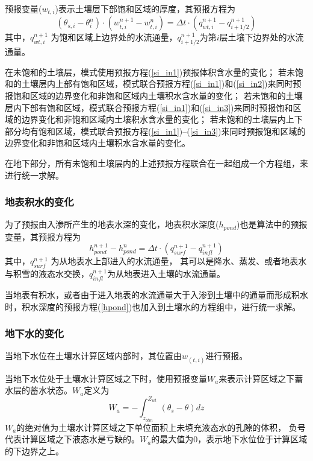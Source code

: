 预报变量($w_{t,i}$)表示土壤层下部饱和区域的厚度，其预报方程为
\begin{equation}\label{si_in3}
\left(\theta_{s, i}-\theta_{i}^{n}\right) \cdot\left(w_{t, i}^{n+1}-w_{t, i}^{n}\right)=\Delta t \cdot\left(q_{w t, i}^{n+1}-q_{i+1 / 2}^{n+1}\right)
\end{equation}
其中，$q_{wt,i}^{n+1}$  为饱和区域上边界处的水流通量，$q_{i+1/2}^{n+1}$为第$i$层土壤下边界处的水流通量。


在未饱和的土壤层，模式使用预报方程(\ref{si_in1})预报体积含水量的变化；
若未饱和的土壤层内上部有饱和区域，模式联合预报方程(\ref{si_in1})和(\ref{si_in2})来同时预报饱和区域的边界变化和非饱和区域内土壤积水含水量的变化；
若未饱和的土壤层内下部有饱和区域，模式联合预报方程(\ref{si_in1})和(\ref{si_in3})来同时预报饱和区域的边界变化和非饱和区域内土壤积水含水量的变化；
若未饱和的土壤层内上下部分均有饱和区域，模式联合预报方程(\ref{si_in1})--(\ref{si_in3})来同时预报饱和区域的边界变化和非饱和区域内土壤积水含水量的变化。


在地下部分，所有未饱和土壤层内的上述预报方程联合在一起组成一个方程组，来进行统一求解。

\subsubsection{地表积水的变化}
为了预报由入渗所产生的地表水深的变化，地表积水深度($h_{pond}$)也是算法中的预报变量，其预报方程为
\begin{equation}\label{hpond}
h_{ {pond }}^{n+1}-h_{ {pond }}^{n}=\Delta t \cdot\left(q_{ {surf }}^{n+1}-q_{ {infl }}^{n+1}\right)
\end{equation}
其中，$q_{surf}^{n+1} $ 为从地表水上部进入的水流通量，
其可以是降水、蒸发、或者地表水与积雪的液态水交换，$q_{infl}^{n+1}$为从地表进入土壤的水流通量。


当地表有积水，或者由于进入地表的水流通量大于入渗到土壤中的通量而形成积水时，积水深度的预报方程(\ref{hpond})也加入到土壤水的方程组中，进行统一求解。


\subsubsection{地下水的变化}
当地下水位在土壤水计算区域内部时，其位置由$w_{(t,i)}$进行预报。


当地下水位处于土壤水计算区域之下时，使用预报变量$W_a$来表示计算区域之下蓄水层的蓄水状态。$W_a$定义为
\begin{equation}
W_{a}=-\int_{z_{b t m}}^{Z_{w t}}\left(\theta_{s}-\theta\right) d z
\end{equation}
$W_a$的绝对值为土壤水计算区域之下单位面积上未填充液态水的孔隙的体积，
负号代表计算区域之下液态水是亏缺的。$W_a$的最大值为0，表示地下水位位于计算区域的下边界之上。



